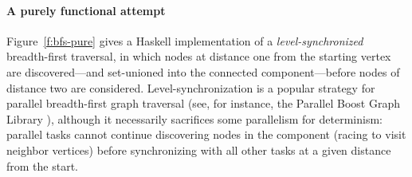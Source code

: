 \paragraph{A purely functional attempt}
Figure~\ref{f:bfs-pure} gives a Haskell implementation of 
a {\em level-synchronized} breadth-first traversal,
in which nodes at distance one from the starting vertex are
  discovered---and set-unioned into the connected component---before nodes of
  distance two are considered.  Level-synchronization is a popular strategy for
parallel breadth-first graph traversal (see, for instance, the Parallel Boost Graph Library \cite{bfs-pbgl}), although it necessarily sacrifices
some parallelism for determinism: parallel tasks cannot continue discovering
nodes in the component (racing to visit neighbor vertices) before synchronizing
with all other tasks at a given distance from the start.

%
%

